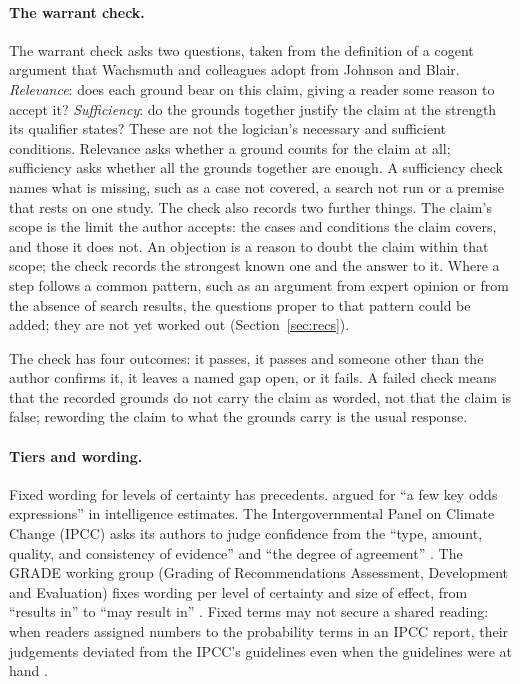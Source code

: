 \documentclass[12pt, a4paper]{article}
\begin{document}
\paragraph{The warrant check.}
The warrant check asks two questions, taken from the definition of a
cogent argument that Wachsmuth and colleagues adopt from Johnson and
Blair.  \emph{Relevance}: does each ground bear on this claim, giving a
reader some reason to accept it?  \emph{Sufficiency}: do the grounds together justify the
claim at the strength its qualifier states?  These are not the
logician's necessary and sufficient conditions.  Relevance asks whether
a ground counts for the claim at all; sufficiency asks whether all the
grounds together are enough.  A sufficiency check names
what is missing, such as a case not covered, a search not run or a
premise that rests on one study.  The check also records two further
things.  The claim's scope is the limit the author accepts: the cases
and conditions the claim covers, and those it does not.  An objection
is a reason to doubt the claim within that scope; the check records the
strongest known one and the answer to it.  Where a step follows a common pattern,
such as an argument from expert opinion or from the absence of search
results, the questions proper to that pattern could be added; they are not yet worked out (Section~\ref{sec:recs}).

The check has four outcomes: it passes, it passes and someone other than
the author confirms it, it leaves a named gap open, or it fails.  A
failed check means that the recorded grounds do not carry the claim as
worded, not that the claim is false; rewording the claim to what the
grounds carry is the usual response.

\paragraph{Tiers and wording.}
Fixed wording for levels of certainty has precedents.  \citet{kent1964}
argued for ``a few key odds expressions'' in intelligence estimates.  The Intergovernmental Panel on Climate Change (IPCC) asks its authors to
judge confidence from the ``type, amount, quality, and consistency of
evidence'' and ``the degree of agreement'' \citep{mastrandrea2010}.  The GRADE working group (Grading of Recommendations Assessment,
Development and Evaluation) fixes wording per level of certainty and size
of effect, from ``results in'' to ``may result in'' \citep{santesso2020}.
Fixed terms may not secure a shared reading: when readers assigned
numbers to the probability terms in an IPCC report, their judgements
deviated from the IPCC's guidelines even when the guidelines were at
hand \citep{budescu2009}.
\end{document}

